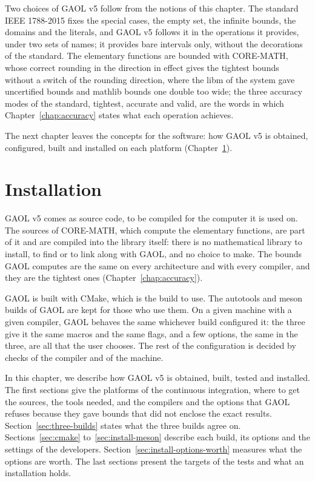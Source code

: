 \documentclass[12pt,a4paper,twoside,openright]{book}
\begin{document}
\medskip
Two choices of GAOL v5 follow from the notions of this chapter. The
standard IEEE 1788-2015 fixes the special cases, the empty set, the
infinite bounds, the domains and the literals, and GAOL v5 follows it in
the operations it provides, under two sets of names; it provides bare
intervals only, without the decorations of the standard. The elementary
functions are bounded with CORE-MATH, whose correct rounding in the
direction in effect gives the tightest bounds without a switch of the
rounding direction, where the libm of the system gave uncertified bounds
and mathlib bounds one double too wide; the three accuracy modes of the
standard, tightest, accurate and valid, are the words in which
Chapter~\ref{chap:accuracy} states what each operation achieves.

\medskip
The next chapter leaves the concepts for the software: how GAOL v5 is
obtained, configured, built and installed on each platform
(Chapter~\ref{chap:installation}).

\chapter{Installation}\label{chap:installation}

GAOL v5 comes as source code, to be compiled for the computer it is used on.
The sources of CORE-MATH, which compute the elementary functions, are part of
it and are compiled into the library  itself: there is no
mathematical library to install, to find or to link along with GAOL, and no
choice to make. The bounds GAOL computes are the same on every architecture
and with every compiler, and they are the tightest ones
(Chapter~\ref{chap:accuracy}).

\medskip
GAOL is built with CMake, which is the build to use. The autotools and meson
builds of GAOL are kept for those who use them. On a given machine with a
given compiler, GAOL behaves the same whichever build configured it: the three
give it the same macros and the same flags, and a few options, the same in the
three, are all that the user chooses. The rest of the configuration is decided
by checks of the compiler and of the machine.

\medskip
In this chapter, we describe how GAOL v5 is obtained, built, tested and
installed. The first sections give the platforms of the continuous
integration, where to get the sources, the tools needed, and the compilers and
the options that GAOL refuses because they gave bounds that did not enclose
the exact results. Section~\ref{sec:three-builds} states what the three builds
agree on. Sections~\ref{sec:cmake} to~\ref{sec:install-meson} describe each
build, its options and the settings of the developers.
Section~\ref{sec:install-options-worth} measures what the options are worth.
The last sections present the targets of the tests and what an installation
holds.
\end{document}
